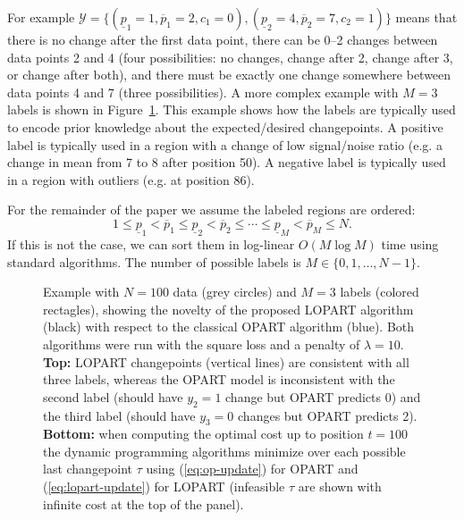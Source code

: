 \documentclass[12pt]{article}
\begin{document}
For example
$\mathcal Y=\{
(\underline p_1=1,\overline p_1=2,c_1=0),
(\underline p_2=4,\overline p_2=7,c_2=1)
\}$ 
means that there is no change after the first data point, 
there can be 0--2 changes between data points 2 and 4 (four possibilities: no changes, change after 2, change after 3, or change after both),
and there must be exactly one change somewhere
between data points 4 and 7 (three possibilities). 
A more complex example with $M=3$ labels is shown in Figure~\ref{fig:signal-cost}. 
This example shows how the labels are typically used to encode prior knowledge about the expected/desired changepoints. 
A positive label is typically used in a region with a change of low signal/noise ratio (e.g. a change in mean from 7 to 8 after position 50).
A negative label is typically used in a region with outliers (e.g. at position 86).

For the remainder of the paper we assume the
labeled regions are ordered:
\begin{equation}
  \label{eq:sorted}
  1 \leq 
\underline p_1 < \overline p_1 \leq 
\underline p_2 < \overline p_2 \leq
\cdots \leq 
\underline p_M < \overline p_M \leq 
N.
\end{equation}
If this is not the case, we can sort them in log-linear $O(M\log M)$ time using standard algorithms.
The number of possible labels is $M\in\{0, 1, \dots, N-1\}$.

\begin{figure}
    
    \vskip -0.5cm
    \caption{
    Example with $N=100$ data (grey circles) and $M=3$ labels (colored rectagles), 
    showing the novelty of the proposed LOPART algorithm (black) with respect to the classical OPART algorithm (blue). Both algorithms were run with the square loss and a penalty of $\lambda=10$.
    \textbf{Top:} LOPART changepoints (vertical lines) are consistent with 
    all three labels, whereas the OPART model is inconsistent with the second label (should have $y_2=1$ change but OPART predicts 0) and the third label (should have $y_3=0$ changes but OPART predicts 2).
    \textbf{Bottom:} when computing the optimal cost up to position $t=100$ the dynamic programming algorithms minimize over each possible last changepoint $\tau$ using (\ref{eq:op-update}) for OPART and (\ref{eq:lopart-update}) for LOPART (infeasible $\tau$ are shown with infinite cost at the top of the panel). 
    }
    \label{fig:signal-cost}
\end{figure}
\end{document}
